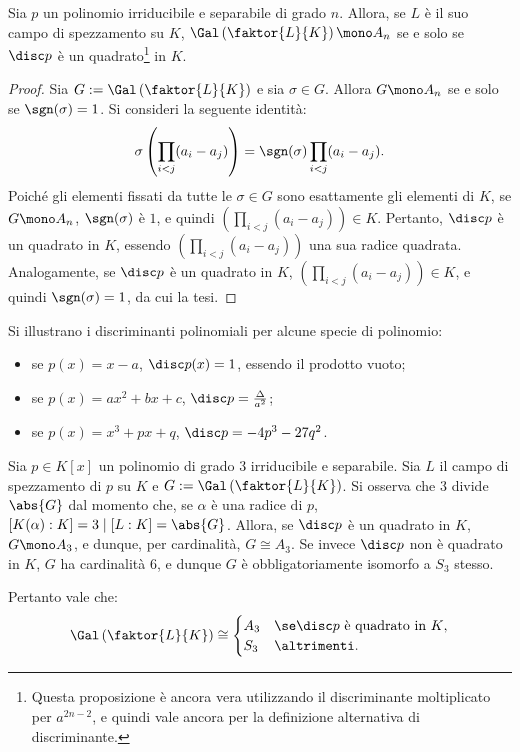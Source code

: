 \documentclass[12pt]{scrartcl}
\begin{document}
	\begin{proposition}
		Sia $p$ un polinomio irriducibile e separabile di grado $n$. Allora, se $L$ è il suo
		campo di spezzamento su $K$, $\Gal\left(\faktor{L}{K}\right) \mono A_n$ se e
		solo se $\disc p$ è un quadrato\footnote{
			Questa proposizione è ancora vera utilizzando il discriminante moltiplicato
			per $a^{2n-2}$, e quindi vale ancora per la definizione alternativa di
			discriminante.
		} in $K$.
	\end{proposition}
	
	\begin{proof}
		Sia $G := \Gal\left(\faktor{L}{K}\right)$ e sia $\sigma \in G$. Allora $G \mono A_n$ se e solo se
		$\sgn(\sigma) = 1$. Si consideri la seguente identità:
		\[ \sigma\left(\prod_{i < j} (a_i - a_j)\right) =  \sgn(\sigma) \prod_{i < j} (a_i - a_j). \]
		Poiché gli elementi fissati da tutte le $\sigma \in G$ sono esattamente gli
		elementi di $K$, se $G \mono A_n$, $\sgn(\sigma)$ è $1$, e quindi
		$\left(\prod_{i < j} (a_i - a_j)\right) \in K$. Pertanto, $\disc p$ è un
		quadrato in $K$, essendo $\left(\prod_{i < j} (a_i - a_j)\right)$ una sua
		radice quadrata. Analogamente, se $\disc p$ è un quadrato in $K$,
		$\left(\prod_{i < j} (a_i - a_j)\right) \in K$, e quindi
		$\sgn(\sigma) = 1$, da cui la tesi.
	\end{proof}

	\begin{remark}
		Si illustrano i discriminanti polinomiali per alcune specie di polinomio:
		\begin{itemize}
			\item se $p(x) = x-a$, $\disc p(x) = 1$, essendo il prodotto vuoto;
			\item se $p(x) = ax^2 + bx + c$, $\disc p = \frac{\Delta}{a^2}$;
			\item se $p(x) = x^3 + px + q$, $\disc p = -4p^3 - 27 q^2$.
		\end{itemize}
	\end{remark}

	\begin{remark}[classificazione dei gruppi di Galois per $\deg p = 3$]
		Sia $p \in K[x]$ un polinomio di grado $3$ irriducibile e separabile. Sia
		$L$ il campo di spezzamento di $p$ su $K$ e $G := \Gal\left(\faktor{L}{K}\right)$. Si osserva che $3$ divide $\abs{G}$ dal momento che, se $\alpha$ è una radice di $p$,
		$[K(\alpha) : K] = 3 \mid [L : K] = \abs{G}$. Allora,
		se $\disc p$ è un quadrato in $K$, $G \mono A_3$, e dunque, per cardinalità,
		$G \cong A_3$. Se invece $\disc p$ non è quadrato in $K$, $G$ ha
		cardinalità $6$, e dunque
		$G$ è obbligatoriamente isomorfo a $S_3$ stesso. \medskip
		
		
		Pertanto vale che:
		\[  \Gal\left(\faktor{L}{K}\right) \cong \begin{cases}
			A_3 & \se \disc p \text{ è quadrato in $K$}, \\
			S_3 & \altrimenti.
		\end{cases} \]
	\end{remark} \bigskip
	
\end{document}
